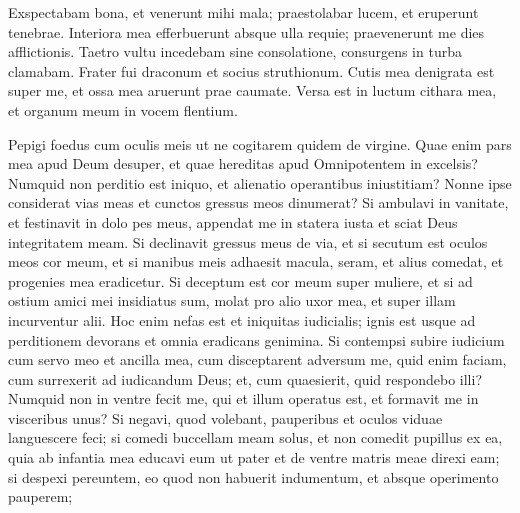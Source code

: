 \begin{biblechapter}
\begin{biblechapter}
\begin{biblechapter}
\begin{biblechapter}
\begin{biblechapter}
\begin{biblechapter}
\begin{biblechapter}
\begin{biblechapter}
\begin{biblechapter}
\begin{biblechapter}
\begin{biblechapter}
\begin{biblechapter}
\begin{biblechapter}
\begin{biblechapter}
\begin{biblechapter}
\begin{biblechapter}
\begin{biblechapter}
\begin{biblechapter}
\begin{biblechapter}
\begin{biblechapter}
\begin{biblechapter}
\begin{biblechapter}
\begin{biblechapter}
\begin{biblechapter}
\begin{biblechapter}
\begin{biblechapter}
\begin{biblechapter}
\begin{biblechapter}
\begin{biblechapter}
\begin{biblechapter}
 \verse Exspectabam bona, et venerunt mihi mala;
 praestolabar lucem, et eruperunt tenebrae.
 \verse Interiora mea efferbuerunt absque ulla requie;
 praevenerunt me dies afflictionis.
 \verse Taetro vultu incedebam sine consolatione,
 consurgens in turba clamabam.
 \verse Frater fui draconum
 et socius struthionum.
 \verse Cutis mea denigrata est super me,
 et ossa mea aruerunt prae caumate.
 \verse Versa est in luctum cithara mea,
 et organum meum in vocem flentium.
 
\begin{biblechapter}
\verse Pepigi foedus cum oculis meis
 ut ne cogitarem quidem de virgine.
 \verse Quae enim pars mea apud Deum desuper,
 et quae hereditas apud Omnipotentem in excelsis?
 \verse Numquid non perditio est iniquo,
 et alienatio operantibus iniustitiam?
 \verse Nonne ipse considerat vias meas
 et cunctos gressus meos dinumerat?
 \verse Si ambulavi in vanitate,
 et festinavit in dolo pes meus,
 \verse appendat me in statera iusta
 et sciat Deus integritatem meam.
 \verse Si declinavit gressus meus de via,
 et si secutum est oculos meos cor meum,
 et si manibus meis adhaesit macula,
 \verse seram, et alius comedat,
 et progenies mea eradicetur.
 \verse Si deceptum est cor meum super muliere,
 et si ad ostium amici mei insidiatus sum,
 \verse molat pro alio uxor mea,
 et super illam incurventur alii.
 \verse Hoc enim nefas est
 et iniquitas iudicialis;
 \verse ignis est usque ad perditionem devorans
 et omnia eradicans genimina.
 \verse Si contempsi subire iudicium cum servo meo et ancilla mea,
 cum disceptarent adversum me,
 \verse quid enim faciam, cum surrexerit ad iudicandum Deus;
 et, cum quaesierit, quid respondebo illi?
 \verse Numquid non in ventre fecit me,
 qui et illum operatus est,
 et formavit me in visceribus unus?
 \verse Si negavi, quod volebant, pauperibus
 et oculos viduae languescere feci;
 \verse si comedi buccellam meam solus,
 et non comedit pupillus ex ea,
 \verse quia ab infantia mea educavi eum ut pater
 et de ventre matris meae direxi eam;
 \verse si despexi pereuntem, eo quod non habuerit indumentum,
 et absque operimento pauperem;

\end{biblechapter}
\end{biblechapter}
\end{biblechapter}
\end{biblechapter}
\end{biblechapter}
\end{biblechapter}
\end{biblechapter}
\end{biblechapter}
\end{biblechapter}
\end{biblechapter}
\end{biblechapter}
\end{biblechapter}
\end{biblechapter}
\end{biblechapter}
\end{biblechapter}
\end{biblechapter}
\end{biblechapter}
\end{biblechapter}
\end{biblechapter}
\end{biblechapter}
\end{biblechapter}
\end{biblechapter}
\end{biblechapter}
\end{biblechapter}
\end{biblechapter}
\end{biblechapter}
\end{biblechapter}
\end{biblechapter}
\end{biblechapter}
\end{biblechapter}
\end{biblechapter}
